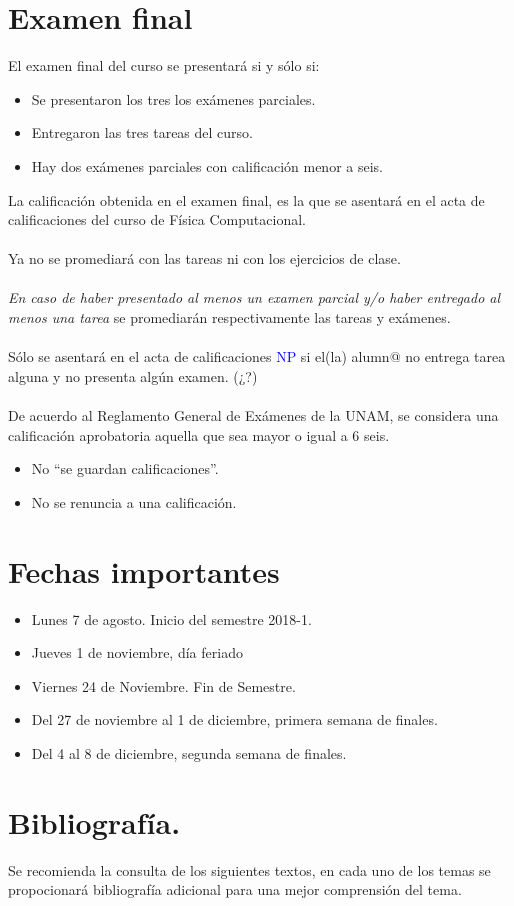 \documentclass[12pt]{article}
\begin{document}
\section{Examen final}
El examen final del curso se presentará si y sólo si:
\begin{itemize}
\item Se presentaron los tres los exámenes parciales.
\item Entregaron las tres tareas del curso.
\item Hay dos exámenes parciales con calificación menor a seis.
\end{itemize}
La calificación obtenida en el examen final, es la que se asentará en el acta de calificaciones del curso de Física Computacional.
\\
\\
Ya no se promediará con las tareas ni con los ejercicios de clase.\\
\\
\emph{En caso de haber presentado al menos un examen parcial y/o haber entregado al menos una tarea} se promediarán respectivamente las tareas y exámenes.
\\
\\
Sólo se asentará en el acta de calificaciones \textcolor{blue}{NP} si el(la) alumn{@} no entrega tarea alguna y no presenta algún examen. (¿?)
\\
\\
De acuerdo al Reglamento General de Exámenes de la UNAM, se considera una calificación aprobatoria aquella que sea mayor o igual a $6$ seis.
\begin{itemize}
\item No \enquote{se guardan calificaciones}.
\item No se renuncia a una calificación.
\end{itemize}
\section{Fechas importantes}
\begin{itemize}
\item Lunes 7 de agosto. Inicio del semestre 2018-1.
\item Jueves 1 de noviembre, día feriado
\item Viernes 24 de Noviembre. Fin de Semestre.
\item Del 27 de noviembre al 1 de diciembre, primera semana de finales.
\item Del 4 al 8 de diciembre, segunda semana de finales.
\end{itemize}
\newpage
\section{Bibliografía.}
Se recomienda la consulta de los siguientes textos, en cada uno de los temas se propocionará bibliografía adicional para una mejor comprensión del tema.
\nocite{*}


\end{document}
